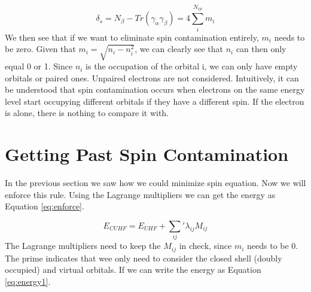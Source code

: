 \documentclass{article}
\begin{document}
\begin{equation}\label{eq:spincon2}
    \delta_s = N_\beta - Tr(\gamma_\alpha\gamma_\beta) = 4\sum_i^{N_{cp}}m_i
\end{equation}
We then see that if we want to eliminate spin contamination entirely, $m_i$ needs to be zero. Given that $m_i = \sqrt{n_i - n_i^2}$, we can clearly see that $n_i$ can then only equal 
0 or 1. Since $n_i$ is the occupation of the orbital i, we can only have empty orbitals or paired ones. Unpaired electrons are not considered. Intuitively, it can be understood that 
spin contamination occurs when electrons on the same energy level start occupying different orbitals if they have a different spin. If the electron is alone, there is nothing to 
compare it with.

\section{Getting Past Spin Contamination}
\label{sec:sol}
In the previous section we saw how we could minimize spin equation. Now we will enforce this rule. Using the Lagrange multipliers we can get the energy as Equation \eqref{eq:enforce}.

\begin{equation}\label{eq:enforce}
    E_{CUHF} = E_{UHF} + \sum_{ij}'\lambda_{ij}M_{ij}
\end{equation}
The Lagrange multipliers need to keep the $M_{ij}$ in check, since $m_i$ needs to be 0. The prime indicates that wee only need to consider the closed shell (doubly occupied) and 
virtual orbitals. If we can write the energy as Equation \eqref{eq:energy1}.
\end{document}
